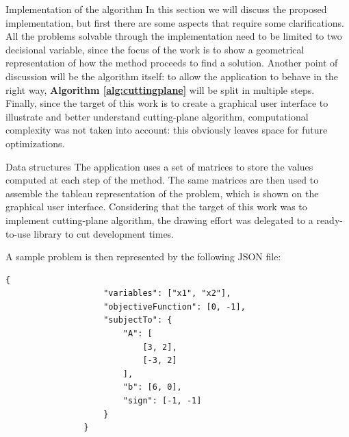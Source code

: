 \documentclass[9pt]{extarticle}
\begin{document}
    \begin{section}{Implementation of the algorithm}
        In this section we will discuss the proposed implementation, but first there are some aspects that require some 
        clarifications. 
        All the problems solvable through the implementation need to be limited to two decisional variable, since the focus of
        the work is to show a geometrical representation of how the method proceeds to find a solution.
        Another point of discussion will be the algorithm itself: to allow the application to behave in the right way, 
        \textbf{Algorithm \ref{alg:cuttingplane}} will be split in multiple steps. \\
        Finally, since the target of this work is to create a graphical user interface to illustrate and better understand
        cutting-plane algorithm, computational complexity was not taken into account: this obviously leaves space for future 
        optimizations.

        \begin{subsection}{Data structures}
            The application uses a set of matrices to store the values computed at each step of the method.
            The same matrices are then used to assemble the tableau representation of the problem, which is shown on the graphical 
            user interface.
            Considering that the target of this work was to implement cutting-plane algorithm, the drawing effort was delegated to
            a ready-to-use library\cite{github:plotly} to cut development times.

            A sample problem is then represented by the following JSON file:

            \vspace{10px}
            \begin{lstlisting}[style=json,caption={JSON file example},captionpos=b,label={data:json}]
                {
                    "variables": ["x1", "x2"],
                    "objectiveFunction": [0, -1],
                    "subjectTo": {
                        "A": [
                            [3, 2],
                            [-3, 2]
                        ],
                        "b": [6, 0],
                        "sign": [-1, -1]
                    }
                }
            \end{lstlisting}
            \vspace{20px}
            

\end{subsection}
\end{section}
\end{document}
